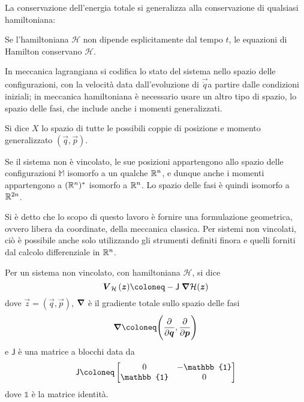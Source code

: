 La conservazione dell'energia totale si generalizza alla conservazione di qualsiasi hamiltoniana:
\begin{theorem}
  Se l'hamiltoniana $\mathcal{H}$ non dipende esplicitamente dal tempo $t$, le equazioni di Hamilton conservano $\mathcal{H}$.
\end{theorem}

In meccanica lagrangiana si codifica lo stato del sistema nello spazio delle configurazioni, con la velocità data dall'evoluzione di $\vec{\dot{q}}$a partire dalle condizioni iniziali; in meccanica hamiltoniana è necessario usare un altro tipo di spazio, lo spazio delle fasi, che include anche i momenti generalizzati.
\begin{definition}
  Si dice  $X$ lo spazio di tutte le possibili coppie di posizione e momento generalizzato $(\vec{q},\vec{p})$.
\end{definition}
\begin{remark}
  Se il sistema non è vincolato, le sue posizioni appartengono allo spazio delle configurazioni $\mathbb{M}$ isomorfo a un qualche $\mathbb{R}^{n}$, e dunque anche i momenti appartengono a $(\mathbb{R}^{n})^*$ isomorfo a $\mathbb{R}^{n}$. Lo spazio delle fasi è quindi isomorfo a $\mathbb{R}^{2n}$.
\end{remark}

Si è detto che lo scopo di questo lavoro è fornire una formulazione geometrica, ovvero libera da coordinate, della meccanica classica. Per sistemi non vincolati, ciò è possibile anche solo utilizzando gli strumenti definiti finora e quelli forniti dal calcolo differenziale in $\mathbb{R}^{n}$.
\begin{definition} \label{eq:hamFieldUnconstr}
  Per un sistema non vincolato, con hamiltoniana $\mathcal{H}$, si dice  \begin{equation}
    \vec{V}_{\mathcal{H}}\,(\vec{z}) \defeq -\mathsf{J}\; \grad{\mathcal{H}} (\vec{z})
  \end{equation}
  dove $\vec{z}=(\vec{q},\vec{p})$, $\grad$ è il gradiente totale sullo spazio delle fasi \begin{equation}
    \grad \defeq \Bigg(\pdv{\vec{q}},\pdv{\vec{p}}\Bigg) 
    \end{equation}
    e $\mathsf{J}$ è una matrice a blocchi data da \begin{equation}
    \mathsf{J} \defeq \bmqty{0 & -\mathbb{1} \\ \mathbb{1} & 0}
    \end{equation}
    dove $\mathbb{1}$ è la matrice identità.
\end{definition}

